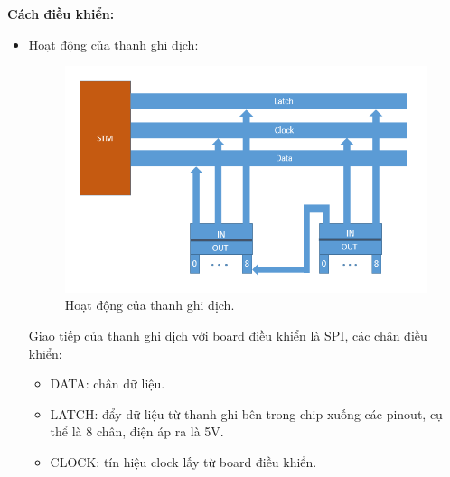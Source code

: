 \documentclass[a4paper,12pt,oneside]{article}
\begin{document}
\begin{itemize}
\end{itemize}


\noindent \textbf{Cách điều khiển:}
\begin{itemize}


\item Hoạt động của thanh ghi dịch:
\begin{center}
\begin{figure}[h!]
\begin{center}
\includegraphics[scale=0.8]{hinh/stm_register.PNG}
\end{center}
\caption{Hoạt động của thanh ghi dịch.}
\end{figure}
\end{center}

\noindent Giao tiếp của thanh ghi dịch với board điều khiển là SPI, các chân điều khiển:
\begin{itemize}
\item DATA: chân dữ liệu.
\item LATCH: đẩy dữ liệu từ thanh ghi bên trong chip xuống các pinout, cụ thể là 8 chân, điện áp ra là 5V.
\item CLOCK: tín hiệu clock lấy từ board điều khiển.
\end{itemize}


\end{itemize}
\end{document}
